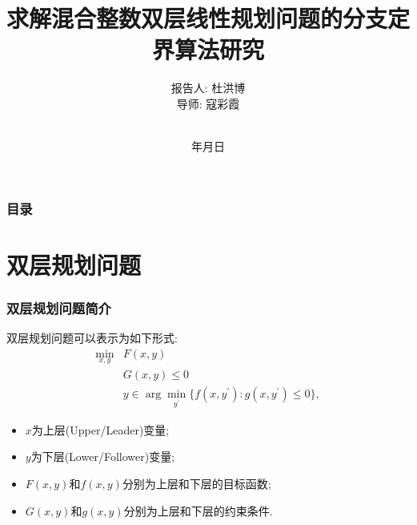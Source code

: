 \documentclass[10pt]{beamer}
\renewcommand{\today}{\number\year 年\number\month 月\number\day 日}
\begin{document}
\justifying
\title[求解混合整数双层线性规划问题的分支定界算法研究]%
{求解混合整数双层线性规划问题的分支定界算法研究}

\author[杜洪博]%
{报告人: 杜洪博\\
导\quad 师: 寇彩霞\rule[0pt]{0pt}{20pt}\\}

\institute[BUPT]{\textcolor[rgb]{0.0,0.0,0.10}%
{\small\ttfamily 北京邮电大学\ 理学院\\[10pt]}}

\date{\today}

\begin{frame}[plain]
	\titlepage
\end{frame}

\begin{frame}
	\frametitle{目录}
	\tableofcontents[hideallsubsections] %
\end{frame}

\AtBeginSection[] %
{ \begin{frame}<beamer> %
		\tableofcontents[currentsection,hideallsubsections]%
	\end{frame}
}


\section{双层规划问题}

\begin{frame}
	\frametitle{双层规划问题简介}
	双层规划问题可以表示为如下形式: 
	\begin{equation}
		\begin{aligned}
			\min_{x,y}& F(x,y)  \\
			&G(x,y)\leq0 \\
			&y\in\arg\operatorname*{min}_{y^{\prime}}\{f(x,y^{\prime}):g(x,y^{\prime})\leq0\},
		\end{aligned}
	\end{equation}
	\begin{itemize}
		\item $x$为上层(Upper/Leader)变量;
		\item $y$为下层(Lower/Follower)变量;
		\item $F(x,y)$和$f(x,y)$分别为上层和下层的目标函数;
		\item $G(x,y)$和$g(x,y)$分别为上层和下层的约束条件.
	\end{itemize}
\end{frame}
\end{document}

